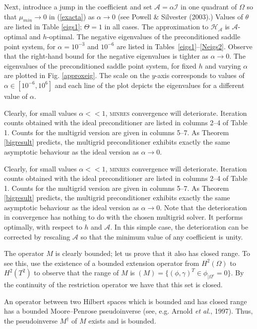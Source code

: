 \documentclass{imamci}
\numberwithin{equation}{section}
\begin{document}
\begin{example}
Next, introduce a jump in the coefficient and set $\mathcal{A} = \alpha \mathcal{I}$
in one quadrant of $\Omega$ so that $\mu_{min} \to 0$ in (\ref{exacta})
as $\alpha \to 0$ (see Powell \& Silvester (2003).) Values of $\theta$ are listed
in Table \ref{eigs1};  $\Theta =1$ in all cases. The approximation to $\mathcal{H
}_{\mathcal{A}}$ is $\mathcal{A}$-optimal and $h$-optimal. The negative eigenvalues
of the preconditioned saddle point system, for $\alpha = 10^{-3}$ and $10^{-6}$
are listed in Tables~\ref{eigs1}--\ref{Neigs2}. Observe that the right-hand
bound for the negative eigenvalues is tighter as $\alpha \to 0.$ The eigenvalues
of the preconditioned saddle point system, for fixed $h$ and varying $\alpha$
are plotted in Fig. \ref{approxeig}. The scale on the $y$-axis corresponds
to values of $\alpha \in \left[10^{-6}, 10^{6}\right]$ and each line of the
plot depicts the eigenvalues for a different value of $\alpha.$ 


 Clearly, for small values $\alpha < <1$, \textsc{minres} convergence will
deteriorate. Iteration counts obtained with the ideal preconditioner are
listed in columns 2--4 of Table 1. Counts for the multigrid
version are given in columns 5--7. As Theorem \ref{bigresult} predicts, the
multigrid preconditioner exhibits exactly the same asymptotic behaviour as
the ideal version as $\alpha \to 0$. 



Clearly, for small values $\alpha < <1$, \textsc{minres} convergence will
deteriorate. Iteration counts obtained with the ideal preconditioner are
listed in columns 2--4 of Table 1. Counts for the multigrid
version are given in columns 5--7. As Theorem \ref{bigresult} predicts, the
multigrid preconditioner exhibits exactly the same asymptotic behaviour as
the ideal version as $\alpha \to 0$. Note that the deterioration in convergence
has nothing to do with the chosen multigrid solver. It performs optimally,
with respect to $h$ and $\mathcal{A}.$ In this simple case, the deterioration
can be corrected by rescaling $\mathcal{A}$ so that the minimum value of
any coefficient is unity.
\end{example}
\begin{case}
  The operator $M$ is clearly bounded; let us prove that it also has closed
  range. To see this, use the existence of a bounded extension
  operator from $H^2(\Omega)$ to $H^2(T^2)$ to observe that the range of
  $M$ is $(M)=\{(\phi,\gamma)^T\in \phi_{|\Omega^c}=0\}$. By the continuity of the restriction operator we have that this set is closed.
  
  An operator between two Hilbert spaces which is bounded and has
  closed range has a bounded Moore--Penrose pseudoinverse (see, e.g. Arnold
  {\it et al.}, 1997). Thus, the pseudoinverse $M^\dagger$ of $M$ exists
  and is bounded.
\end{case}
\end{document}
